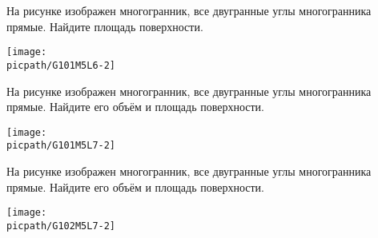 \begin{consultation}
	\begin{listofex}
		\item 
		\begin{minipage}[t]{\bodywidth}
			На рисунке изображен многогранник, все двугранные углы многогранника прямые. Найдите площадь поверхности.
		\end{minipage}
		\hspace{0.02\linewidth}
		\begin{minipage}[t]{\picwidth}
			\texttt{[image: \\picpath/G101M5L6-2]}
		\end{minipage}
		\item 
		\begin{minipage}[t]{\bodywidth}
			На рисунке изображен многогранник, все двугранные углы многогранника прямые. Найдите его объём и площадь поверхности.
		\end{minipage}
		\hspace{0.02\linewidth}
		\begin{minipage}[t]{\picwidth}
			\texttt{[image: \\picpath/G101M5L7-2]}
		\end{minipage}
		\item 
		\begin{minipage}[t]{\bodywidth}
			На рисунке изображен многогранник, все двугранные углы многогранника прямые. Найдите его объём и площадь поверхности.
		\end{minipage}
		\hspace{0.02\linewidth}
		\begin{minipage}[t]{\picwidth}
			\texttt{[image: \\picpath/G102M5L7-2]}
		\end{minipage}
		

\end{listofex}
\end{consultation}
